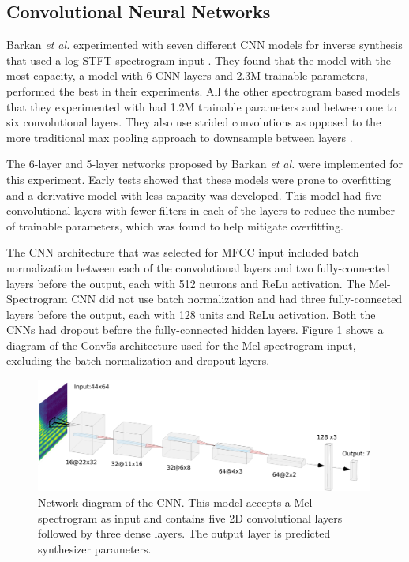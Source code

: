 \subsection{Convolutional Neural Networks}
Barkan \textit{et al.} experimented with seven different CNN models for inverse synthesis that used a log STFT spectrogram input \cite{barkan2019inversynth}. They found that the model with the most capacity, a model with 6 CNN layers and 2.3M trainable parameters, performed the best in their experiments. All the other spectrogram based models that they experimented with had 1.2M trainable parameters and between one to six convolutional layers. They also use strided convolutions as opposed to the more traditional max pooling approach to downsample between layers \cite{goodfellow2016deep}.

The 6-layer and 5-layer networks proposed by Barkan \textit{et al.} were implemented for this experiment. Early tests showed that these models were prone to overfitting and a derivative model with less capacity was developed. This model had five convolutional layers with fewer filters in each of the layers to reduce the number of trainable parameters, which was found to help mitigate overfitting.

The CNN architecture that was selected for MFCC input included batch normalization between each of the convolutional layers and two fully-connected layers before the output, each with 512 neurons and ReLu activation. The Mel-Spectrogram CNN did not use batch normalization and had three fully-connected layers before the output, each with 128 units and ReLu activation. Both the CNNs had dropout before the fully-connected hidden layers. Figure \ref{fig:conv5s} shows a diagram of the Conv5s architecture used for the Mel-spectrogram input, excluding the batch normalization and dropout layers.

\begin{figure}[ht]
    \centering
    \includegraphics[width=0.99\textwidth]{figures/inverse-synth/CONV5s_Diagram.png}
    \caption{Network diagram of the CNN. This model accepts a Mel-spectrogram as input and contains five 2D convolutional layers followed by three dense layers. The output layer is predicted synthesizer parameters.}
    \label{fig:conv5s}
\end{figure}

